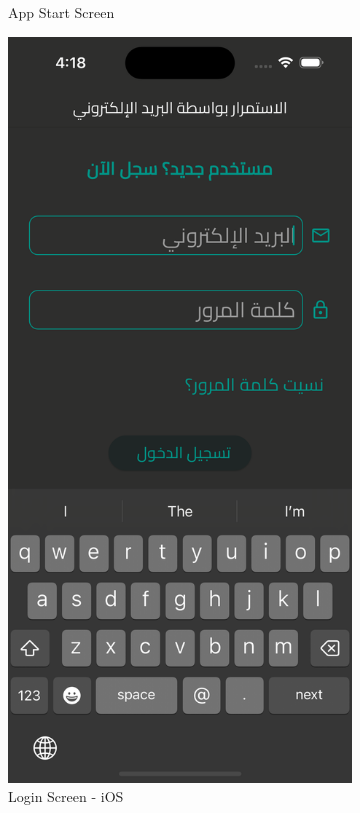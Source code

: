 \documentclass[a4paper, 12pt]{report} %
\begin{document}
\begin{figure}[H]
\begin{subfigure}{0.3\textwidth}
                    \caption{App Start Screen}
                    \label{fig:real_first_screen}
                \end{subfigure}
                \begin{subfigure}{0.3\textwidth}
                    \includegraphics[width=0.8\linewidth, height=0.9\textheight, keepaspectratio]{Images/user_login.png}
                    \caption{Login Screen - iOS}
                    \label{fig:real_login}
                \end{subfigure}
                \begin{subfigure}{0.3\textwidth}

\end{subfigure}
\end{figure}
\end{document}
